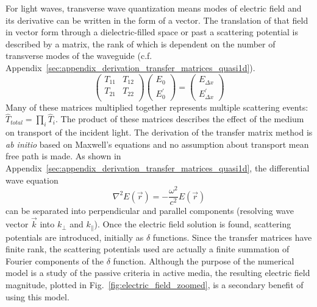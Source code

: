 For light waves, transverse wave quantization means modes of electric field and its derivative can be written in the form of a vector. The translation of that field in vector form through a dielectric-filled space or past a scattering potential is described by a matrix, the rank of which is dependent on the number of transverse modes of the waveguide (c.f. Appendix~\ref{sec:appendix_derivation_transfer_matrices_quasi1d}).
\begin{equation}
 \left( \begin{array}{cc}
T_{11} & T_{12} \\
T_{21} & T_{22} \\
\end{array} \right)
\left( \begin{array}{c}
E_0 \\
E_0^{\prime}
\end{array} \right)
=
\left( \begin{array}{c}
E_{\Delta x} \\
E_{\Delta x}^{\prime}
\end{array} \right)
\end{equation}
Many of these matrices multiplied together represents multiple scattering events: $\hat{T}_{total} = \prod_i \hat{T}_i$. The product of these matrices describes the effect of the medium on transport of the incident light. The derivation of the transfer matrix method is \textit{ab initio} based on Maxwell's equations\cite{1999_Jackson} and no assumption about transport mean free path is made. As shown in Appendix~\ref{sec:appendix_derivation_transfer_matrices_quasi1d}, the differential wave equation
\begin{equation}
\nabla^2 E(\vec{r}) = - \frac{\omega^2}{c^2} E(\vec{r})
\label{eq:wave_equation_electric_field_introduction}
\end{equation}
can be separated into perpendicular and parallel components (resolving wave vector $\vec{k}$ into $k_{\perp}$ and $k_{\parallel}$). Once the electric field solution is found, scattering potentials are introduced, initially as $\delta$ functions. Since the transfer matrices have finite rank, the scattering potentials used are actually a finite summation of Fourier components of the $\delta$ function. Although the purpose of the numerical model is a study of the passive criteria in active media, the resulting electric field magnitude, plotted in Fig.~\ref{fig:electric_field_zoomed}, is a secondary benefit of using this model.

